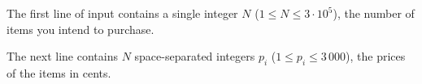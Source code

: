 
The first line of input contains a single integer $N$ ($1 \le N \le 3 \cdot 10^{5}$), the number of items you intend to purchase.

The next line contains $N$ space-separated integers $p_i$ ($1\le p_i\le 3\,000$), the prices of the items in cents.

